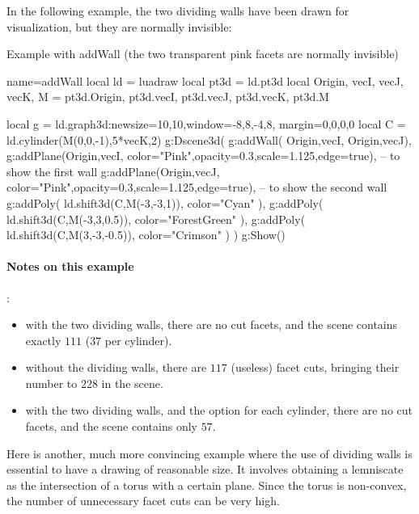 In the following example, the two dividing walls have been drawn for visualization, but they are normally invisible:

\begin{demo}{Example with addWall (the two transparent pink facets are normally invisible)}
\begin{luadraw}{name=addWall}
local ld = luadraw
local pt3d = ld.pt3d
local Origin, vecI, vecJ, vecK, M = pt3d.Origin, pt3d.vecI, pt3d.vecJ, pt3d.vecK, pt3d.M

local g = ld.graph3d:new{size={10,10},window={-8,8,-4,8}, margin={0,0,0,0}}
local C = ld.cylinder(M(0,0,-1),5*vecK,2)
g:Dscene3d(
    g:addWall( {{Origin,vecI}, {Origin,vecJ}}),
    g:addPlane({Origin,vecI}, {color="Pink",opacity=0.3,scale=1.125,edge=true}), -- to show the first wall
    g:addPlane({Origin,vecJ}, {color="Pink",opacity=0.3,scale=1.125,edge=true}), -- to show the second wall
    g:addPoly( ld.shift3d(C,M(-3,-3,1)), {color="Cyan"} ),
    g:addPoly( ld.shift3d(C,M(-3,3,0.5)), {color="ForestGreen"} ),
    g:addPoly( ld.shift3d(C,M(3,-3,-0.5)), {color="Crimson"} )
)
g:Show()
\end{luadraw}
\end{demo}

\paragraph{Notes on this example}:
\begin{itemize}
    \item with the two dividing walls, there are no cut facets, and the scene contains exactly $111$ ($37$ per cylinder).
    \item without the dividing walls, there are $117$ (useless) facet cuts, bringing their number to $228$ in the scene.
    \item with the two dividing walls, and the  option for each cylinder, there are no cut facets, and the scene contains only $57$.
\end{itemize}

Here is another, much more convincing example where the use of dividing walls is essential to have a drawing of reasonable size. It involves obtaining a lemniscate as the intersection of a torus with a certain plane. Since the torus is non-convex, the number of unnecessary facet cuts can be very high.


